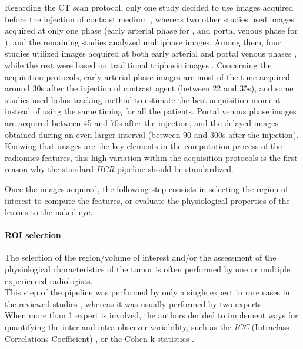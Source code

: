 \documentclass[]{article}
\let\oldparagraph\paragraph
\renewcommand{\paragraph}[1]{\oldparagraph{#1}\mbox{}}
\begin{document}
Regarding the CT scan protocol, only one study decided to use images
acquired before the injection of contrast medium \cite{Cozzi2017}, whereas two other studies used images acquired at only one
phase (early arterial phase for \cite{Raman2015}, and portal
venous phase for \cite{Li2016}), and the remaining studies
analyzed multiphase images. Among them, four studies utilized images
acquired at both early arterial and portal venous phases \cite{Zhou2017a,Chen2017,Kuo2007,Zheng2018}, while the rest were
based on traditional triphasic images \cite{Akai2018,Banerjee2015,Renzulli2016,Segal2007,Peng2018,Bakr2017,Taouli2017,Xia2018}. Concerning the
acquisition protocols, early arterial phase images are most of the time
acquired around 30s after the injection of contrast agent (between 22
and 35s), and some studies used bolus tracking method to estimate the
best acquisition moment instead of using the same timing for all the
patients. Portal venous phase images are acquired between 45 and 70s
after the injection, and the delayed images obtained during an even
larger interval (between 90 and 300s after the injection).\\
Knowing that images are the key elements in the computation process of
the radiomics features, this high variation within the acquisition
protocols is the first reason why the standard \emph{HCR} pipeline
should be standardized.

Once the images acquired, the following step consists in selecting the
region of interest to compute the features, or evaluate the
physiological properties of the lesions to the naked eye.

\paragraph{ROI selection}\label{roi-selection}

The selection of the region/volume of interest and/or the assessment of
the physiological characteristics of the tumor is often performed by one
or multiple experienced radiologists.\\
This step of the pipeline was performed by only a single expert in rare
cases in the reviewed studies \cite{Xia2018,Akai2018}, whereas it was
usually performed by two experts \cite{Zhou2017a,Chen2017,Li2016,Raman2015,Kuo2007,Renzulli2016,Segal2007,Zheng2018,Peng2018,Taouli2017}.\\
When more than 1 expert is involved, the authors decided to implement
ways for quantifying the inter and intra-observer variability, such as
the \emph{ICC} (Intraclass Correlations Coefficient) \cite{Zheng2018,Li2016}, or the Cohen k statistics \cite{Renzulli2016,Banerjee2015}.
\end{document}

